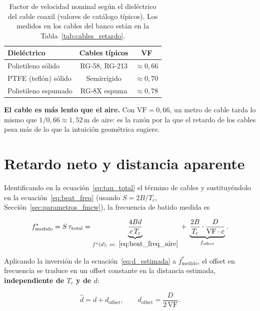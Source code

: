 \documentclass[12pt, a4paper, twoside]{report}
\begin{document}
\begin{table}[H]
  \centering
  \caption{Factor de velocidad nominal según el dieléctrico del cable
    coaxil (valores de catálogo típicos). Los medidos en los cables del
    banco están en la Tabla~\ref{tab:cables_retardo}.}
  \label{tab:vf_cables}
  \begin{tabular}{lcc}
    \toprule
    \textbf{Dieléctrico} & \textbf{Cables típicos} & \textbf{VF} \\
    \midrule
    Polietileno sólido      & RG-58, RG-213 & $\approx 0{,}66$ \\
    PTFE (teflón) sólido    & Semirrígido   & $\approx 0{,}70$ \\
    Polietileno espumado    & RG-8X espuma  & $\approx 0{,}78$ \\
    \bottomrule
  \end{tabular}
\end{table}

\textbf{El cable es más lento que el aire.} Con $\text{VF} = 0{,}66$,
un metro de cable tarda lo mismo que $1/0{,}66 \approx 1{,}52\,\text{m}$
de aire: es la razón por la que el retardo de los cables pesa más de
lo que la intuición geométrica sugiere.

\section{Retardo neto y distancia aparente}
\label{sec:cables_offset}

Identificando en la ecuación~\eqref{eq:tau_total} el término de cables
y sustituyéndolo en la ecuación~\eqref{eq:beat_freq} (usando
$S = 2B/T_c$, Sección~\ref{sec:parametros_fmcw}), la frecuencia de
batido medida es

\begin{equation}
  f^*_\text{medido} = S\,\tau_\text{total}
  = \underbrace{\frac{4Bd}{c\,T_c}}_{f^*(d),\ \text{ec.}~\eqref{eq:beat_freq_aire}}
  \;+\; \underbrace{\frac{2B}{T_c}\cdot\frac{D}{\text{VF}\cdot c}}_{f_\text{offset}}.
  \label{eq:f_offset}
\end{equation}

Aplicando la inversión de la ecuación~\eqref{eq:d_estimada} a
$f^*_\text{medido}$, el offset en frecuencia se traduce en un offset
constante en la distancia estimada, \textbf{independiente de $T_c$ y
de $d$}:

\begin{equation}
  \boxed{
    \hat{d} = d + d_\text{offset},
    \qquad
    d_\text{offset} = \frac{D}{2\,\text{VF}}.
  }
  \label{eq:d_offset}
\end{equation}
\end{document}

